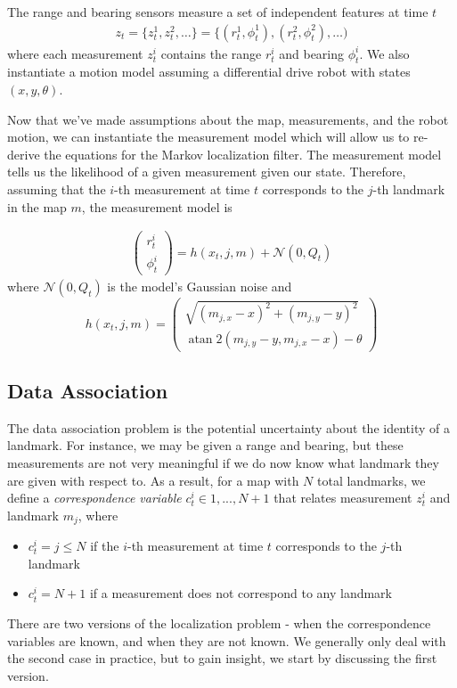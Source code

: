 \documentclass[twoside]{article}
\begin{document}
The range and bearing sensors measure a set of independent features at time $t$
\begin{align}
    z_t = \{z_t^1, z_t^2, \hdots \} = \{(r_t^1,\phi_t^1),(r_t^2,\phi_t^2), \hdots )
\end{align}
where each measurement $z_t^i$ contains the range $r_t^i$ and bearing $\phi_t^i$. We also instantiate a motion model
assuming a differential drive robot with states $(x, y, \theta)$.

Now that we’ve made assumptions about the map, measurements, and the robot motion, we can instantiate the measurement model which will allow us to re-derive the equations for the Markov localization filter. The measurement model tells us the likelihood of a given measurement given our state. Therefore, assuming that the $i$-th measurement at time $t$ corresponds to the $j$-th landmark in the map $m$, the measurement model is

\begin{align}
\left( \begin{array} { c } { r _ { t } ^ { i } } \\ { \phi _ { t } ^ { i } } \end{array} \right) = h \left( x _ { t } , j , m \right) + \mathcal { N } \left( 0 , Q _ { t } \right)
\end{align}
where $\mathcal{N}(0,Q_t)$ is the model's Gaussian noise and
\begin{equation}
    h \left( x _ { t } , j , m \right) = \left( \begin{array} { c } { \sqrt { \left( m _ { j , x } - x \right) ^ { 2 } + \left( m _ { j , y } - y \right) ^ { 2 } } } \\ { \operatorname { atan } 2 \left( m _ { j , y } - y , m _ { j , x } - x \right) - \theta } \end{array} \right)
    \label{hxjm}
\end{equation}
\subsection{Data Association}
The data association problem is the potential uncertainty about the identity of a landmark. For instance,
we may be given a range and bearing, but these measurements are not very meaningful if we do now
know what landmark they are given with respect to. As a result, for a map with $N$ total landmarks, we
define a \textit{correspondence variable} $c_t^i \in 1, ..., N + 1$ that relates measurement $z_t^i$ and landmark $m_j$, where
\begin{itemize}
    \item $c_t^i = j \leq N$ if the $i$-th measurement at time $t$ corresponds to the $j$-th landmark
    \item $c_t^i = N + 1$ if a measurement does not correspond to any landmark
\end{itemize}
There are two versions of the localization problem - when the correspondence variables are known, and
when they are not known. We generally only deal with the second case in practice, but to gain insight, we
start by discussing the first version.
\end{document}
